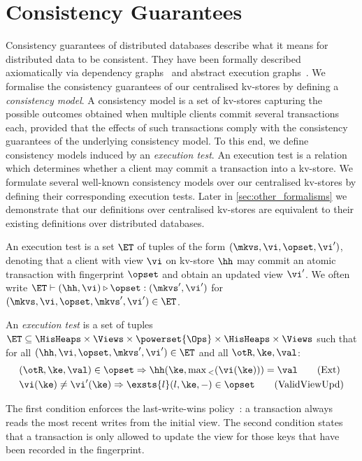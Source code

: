 \section{Consistency Guarantees}
\label{sec:cm}
Consistency guarantees of distributed databases describe
what it means for distributed data to be consistent. 
They have been formally described axiomatically via dependency graphs~\cite{adya-icde,adya}
and abstract execution graphs~\cite{ev_transactions,framework-concur}. 
We formalise the consistency guarantees of our centralised kv-stores by defining a 
\emph{consistency model}. 
A consistency model is a set of kv-stores capturing the possible outcomes 
obtained when multiple clients commit several transactions each, 
provided that the effects of such transactions comply with the consistency guarantees of the underlying consistency model. 
To this end, we define consistency models induced by an \emph{execution test}.
An execution test is a relation which determines whether a client may commit a transaction into a kv-store.  
We formulate several well-known consistency models over our centralised kv-stores 
by defining their corresponding execution tests. 
Later in \cref{sec:other_formalisms} we demonstrate that our definitions over centralised kv-stores are equivalent 
to their existing definitions over distributed databases.




An execution test is a set $\ET$ of tuples of the form $(\mkvs, \vi, \opset, \vi')$,
denoting that a client with view $\vi$ on kv-store $\hh$  may commit an atomic transaction 
with fingerprint $\opset$  and obtain an updated view $\vi'$. 
We often write
$\ET \vdash (\hh, \vi) \triangleright \opset: ( \mkvs', \vi')$ for
$(\mkvs, \vi, \opset, \mkvs', \vi') \in \ET$.


\begin{definition}
\label{def:execution.test}
An \emph{execution test} is a set of tuples $\ET \subseteq \HisHeaps \times \Views \times \powerset{\Ops} \times \HisHeaps \times \Views$ 
such that for all $(\hh, \vi, \opset, \mkvs', \vi') \in \ET$ and all $\otR, \ke, \val$:
\begin{align}
    & 
	(\otR, \ke, \val) \in \opset \Rightarrow
	\hh(\ke, \max{}_{<}(\vi(\ke))) = \val  
	\tag{Ext} \label{eq:read-external} \\
    & 
    \vi(\ke) \neq \vi'(\ke) 
    \Rightarrow
    \exsts{l} (l, \ke, -) \in \opset
    \tag{ValidViewUpd} \label{eq:valid-view-update}
\end{align}
\end{definition}
%
\noindent 
The first condition enforces the last-write-wins policy~\cite{vogels:2009:ec:1435417.1435432}: 
a transaction always reads the most recent writes from the initial view.  
The second condition states that a transaction is only allowed to update the view for those keys 
that have been recorded in the fingerprint.  

